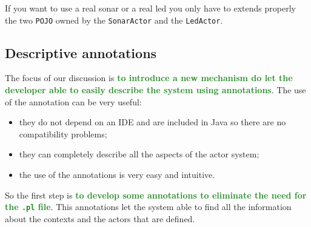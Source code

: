 If you want to use a real sonar or a real led you only have to extends properly the two \texttt{POJO} owned by the \texttt{SonarActor} and the \texttt{LedActor}.

\subsection{Descriptive annotations}

The focus of our discussion is \textcolor{ForestGreen}{\textbf{to introduce a new mechanism do let the developer able to easily describe the system using annotations}}. The use of the annotation can be very useful:
\begin{itemize}
	\item they do not depend on an IDE and are included in Java so there are no compatibility problems;
	\item they can completely describe all the aspects of the actor system;
	\item the use of the annotations is very easy and intuitive.
\end{itemize}

So the first step is \textcolor{ForestGreen}{\textbf{to develop some annotations to eliminate the need for the \texttt{.pl} file}}. This annotations let the system able to find all the information about the contexts and the actors that are defined.

